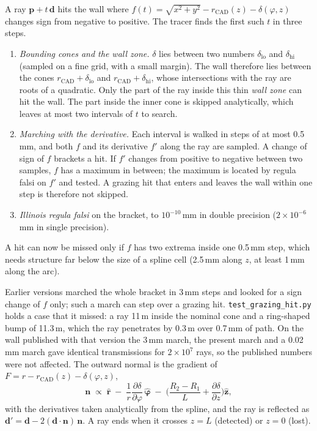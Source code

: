 \documentclass[11pt,a4paper]{article}
\newcommand{\um}{\,\textmu m}
\newcommand{\code}[1]{\texttt{#1}}
\begin{document}
A ray $\mathbf p+t\,\mathbf d$ hits the wall where
$f(t)=\sqrt{x^2+y^2}-r_\mathrm{CAD}(z)-\delta(\varphi,z)$ changes sign from negative to positive. The
tracer finds the first such $t$ in three steps.
\begin{enumerate}
\item \emph{Bounding cones and the wall zone.} $\delta$ lies between two numbers $\delta_\mathrm{lo}$
and $\delta_\mathrm{hi}$ (sampled on a fine grid, with a small margin). The wall therefore lies
between the cones $r_\mathrm{CAD}+\delta_\mathrm{lo}$ and $r_\mathrm{CAD}+\delta_\mathrm{hi}$, whose
intersections with the ray are roots of a quadratic. Only the part of the ray inside this thin
\emph{wall zone} can hit the wall. The part inside the inner cone is skipped analytically, which
leaves at most two intervals of $t$ to search.
\item \emph{Marching with the derivative.} Each interval is walked in steps of at most 0.5\,mm, and
both $f$ and its derivative $f'$ along the ray are sampled. A change of sign of $f$ brackets a hit.
If $f'$ changes from positive to negative between two samples, $f$ has a maximum in between; the
maximum is located by regula falsi on $f'$ and tested. A grazing hit that enters and leaves the wall
within one step is therefore not skipped.
\item \emph{Illinois regula falsi} on the bracket, to $10^{-10}$\,mm in double precision
($2\times10^{-6}$\,mm in single precision).
\end{enumerate}
A hit can now be missed only if $f$ has two extrema inside one 0.5\,mm step, which needs structure far
below the size of a spline cell (2.5\,mm along $z$, at least 1\,mm along the arc).

Earlier versions marched the whole bracket in 3\,mm steps and looked for a sign change of $f$ only;
such a march can step over a grazing hit. \code{test\_grazing\_hit.py} holds a case that it missed:
a ray 11\um{} inside the nominal cone and a ring-shaped bump of 11.3\um, which the ray penetrates by
0.3\um{} over 0.7\,mm of path. On the wall published with that version the 3\,mm march, the present
march and a 0.02\,mm march gave identical transmissions for $2\times10^{7}$ rays, so the published
numbers were not affected.
The outward normal is the gradient of $F=r-r_\mathrm{CAD}(z)-\delta(\varphi,z)$,
\[
  \mathbf n \;\propto\; \hat{\mathbf r} \;-\; \frac{1}{r}\frac{\partial\delta}{\partial\varphi}\,\hat{\boldsymbol\varphi}
  \;-\;\Big(\frac{R_2-R_1}{L}+\frac{\partial\delta}{\partial z}\Big)\hat{\mathbf z},
\]
with the derivatives taken analytically from the spline, and the ray is reflected as
$\mathbf d' = \mathbf d-2(\mathbf d\cdot\mathbf n)\,\mathbf n$. A ray ends when it crosses $z=L$
(detected) or $z=0$ (lost).
\end{document}
